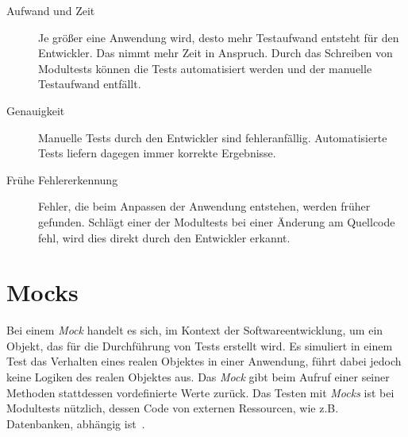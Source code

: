 \begin{description}
    \item[Aufwand und Zeit]
          Je größer eine Anwendung wird, desto mehr Testaufwand entsteht für den Entwickler. Das nimmt mehr Zeit in Anspruch.
          Durch das Schreiben von Modultests können die Tests automatisiert werden und der manuelle Testaufwand entfällt.
    \item[Genauigkeit]
          Manuelle Tests durch den Entwickler sind fehleranfällig. Automatisierte Tests liefern dagegen immer korrekte Ergebnisse.
    \item[Frühe Fehlererkennung]
          Fehler, die beim Anpassen der Anwendung entstehen, werden früher gefunden. Schlägt einer der
          Modultests bei einer Änderung am Quellcode fehl, wird dies direkt durch den Entwickler erkannt.
\end{description}

\section{Mocks}

Bei einem \textit{Mock} handelt es sich, im Kontext der Softwareentwicklung, um ein Objekt, das für die Durchführung von Tests erstellt wird.
Es simuliert in einem Test das Verhalten eines realen Objektes in einer Anwendung, führt dabei jedoch keine Logiken des realen Objektes aus.
Das \textit{Mock} gibt beim Aufruf einer seiner Methoden stattdessen vordefinierte Werte zurück.
Das Testen mit \textit{Mocks} ist bei Modultests nützlich, dessen Code von externen Ressourcen, wie z.B. Datenbanken, abhängig ist~\cite{mocks-definition}.